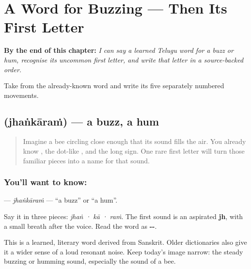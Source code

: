 
\chapter{A Word for Buzzing — Then Its First Letter}
\label{ch:te-jhankaram-jha}

\begin{chapteropening}
\textbf{By the end of this chapter:} \emph{I can say a learned Telugu word for a buzz or hum, recognise its uncommon first letter, and write that letter in a source-backed order.}

Take  from the already-known word  and write its five separately numbered movements.
\end{chapteropening}

\section[\texorpdfstring{\te{ఝంకారం} (jhaṅkāraṁ)}{ఝంకారం (jhaṅkāraṁ)}]{ (jhaṅkāraṁ) — a buzz, a hum}

\label{lesson:TE-C152-jhankaram}



\begin{quote}
Imagine a bee circling close enough that its sound fills the air. You already know \textbf{}, the dot-like \textbf{}, and the long \textbf{} sign. One rare first letter will turn those familiar pieces into a name for that sound.
\end{quote}

\subsection*{You'll want to know: }
\textbf{} — \emph{jhaṅkāraṁ} — \textquotedblleft{}a buzz\textquotedblright{} or \textquotedblleft{}a hum\textquotedblright{}.

Say it in three pieces: \emph{jhaṅ · kā · raṁ}. The first sound is an aspirated \textbf{jh}, with a small breath after the voice. Read the word as \textbf{--}.

This is a learned, literary word derived from Sanskrit. Older dictionaries also give it a wider sense of a loud resonant noise. Keep today's image narrow: the steady buzzing or humming sound, especially the sound of a bee.

